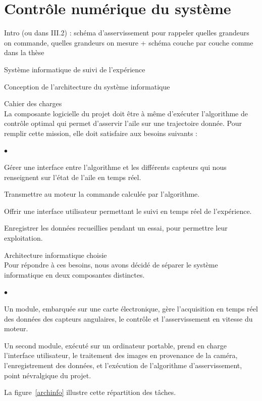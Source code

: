 \documentclass[a4paper,twoside,12pt]{article}
\newcounter{partie}
\newcounter{sous-partie}
\newenvironment{partie}[1]
{
\section{#1}
}
{

}
\newenvironment{sous-partie}[1]
{
\subsection{#1}
}
{

}
\newenvironment{sous-sous-partie}[1]
{
\subsubsection{#1}
}
{

}
\newenvironment{liste}
{
\vspace{0.2cm}
\begin{list}{$\bullet$\hspace{0.3cm}}{\leftmargin=1.4cm}
}
{
\end{list}
\vspace{0.2cm}
}
\begin{document}
\begin{partie}{Contrôle numérique du système}
Intro (ou dans III.2) : schéma d'asservissement pour rappeler quelles grandeurs on commande, quelles grandeurs on mesure + schéma couche par  couche comme dans la thèse

\begin{sous-partie}{Système informatique de suivi de l'expérience}

\begin{sous-sous-partie}{Conception de l'architecture du système informatique}

\begin{paragraph}{Cahier des charges\vspace{0.3cm}\\}
La composante logicielle du projet doit être à même d'exécuter l'algorithme de contrôle optimal qui permet d'asservir l'aile sur une trajectoire donnée. %
Pour remplir cette mission, elle doit satisfaire aux besoins suivants :
\begin{liste}
\item Gérer une interface entre l'algorithme et les différents capteurs qui nous renseignent sur l'état de l'aile en temps réel.
\item Transmettre au moteur la commande calculée par l'algorithme.
\item Offrir une interface utilisateur permettant le suivi en temps réel de l'expérience.
\item Enregistrer les données recueillies pendant un essai, pour permettre leur exploitation.
\end{liste}
\end{paragraph}

\begin{paragraph}{Architecture informatique choisie\vspace{0.3cm}\\}
Pour répondre à ces besoins, nous avons décidé de séparer le système informatique en deux composantes distinctes. %

\begin{liste}
\item Un module, embarquée sur une carte électronique, gère l'acquisition en temps réel des données des capteurs angulaires, le contrôle et l'asservissement en vitesse du moteur.
\item Un second module, exécuté sur un ordinateur portable, prend en charge l'interface utilisateur, le traitement des images en provenance de la caméra, l'enregistrement des données, et l'exécution de l'algorithme d'asservissement, point névralgique du projet.
\end{liste}
La figure~\ref{archinfo} illustre cette répartition des tâches.
\end{paragraph}


\end{sous-sous-partie}
\end{sous-partie}
\end{partie}
\end{document}
